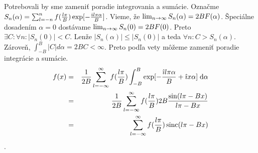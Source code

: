 \begin{dokaz}
    Potrebovali by sme zameniť poradie integrovania a sumácie.
    Označme $S_n(\alpha) = \sum_{l=-n}^{n} f(\frac{l \pi}{B})
    \exp[-\frac{\hat{\imath} l \pi \alpha}{B}]$.
    Vieme, že $\lim_{n\rightarrow \infty} S_n(\alpha) = 2 B F(\alpha)$.
    Špeciálne dosadením $\alpha=0$ dostávame
     $\lim_{n \rightarrow \infty} S_n(0) = 2 B F(0)$.
     Preto $\exists C: \forall n: |S_n(0)| < C$.
     Lenže $|S_n(\alpha)| \le |S_n(0)|$ a teda $\forall n: C >
     S_n(\alpha)$.
     Zároveň, $\int_{-B}^B |C| d\alpha = 2 B C < \infty$.
     Preto podľa vety 
     môžeme zameniť poradie integrácie a sumácie.     
    \begin{eqnarray}
       f(x) & = & \frac{1}{2B}  \sum_{l=-\infty}^{\infty} 
                f(\frac{l \pi}{B}) \int_{-B}^{B} 
                \exp[-\frac{\hat{\imath} l \pi \alpha}{B}
                + \hat{\imath} x \alpha] \; \mathrm{d}\alpha \\
            & = & \frac{1}{2B} \sum_{l=-\infty}^{\infty}
                f(\frac{l \pi}{B}) 2B \frac{\sin(l \pi - B x)}{l \pi -
                B x} \\
            & = & \sum_{l=-\infty}^{\infty}
                f(\frac{l \pi}{B})  \operatorname{sinc}(l \pi - B x)
    \end{eqnarray}
    . \\
    \todo{} \\
    \todo{} \\
    \todo{}
\end{dokaz}

